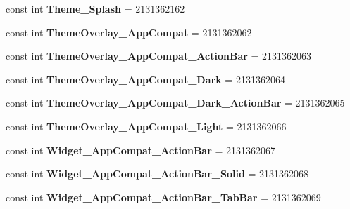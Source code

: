 \begin{DoxyCompactItemize}
\item 
\mbox{\label{classXaria_1_1Resource_1_1Style_a0c5d14f138b3190d6e885be6d8fe0908}} 
const int {\bfseries Theme\+\_\+\+Splash} = 2131362162
\item 
\mbox{\label{classXaria_1_1Resource_1_1Style_afd3ef424b8e9c412bd491f3a3e71a324}} 
const int {\bfseries Theme\+Overlay\+\_\+\+App\+Compat} = 2131362062
\item 
\mbox{\label{classXaria_1_1Resource_1_1Style_a119730b7e96cceb04f849bff5649951b}} 
const int {\bfseries Theme\+Overlay\+\_\+\+App\+Compat\+\_\+\+Action\+Bar} = 2131362063
\item 
\mbox{\label{classXaria_1_1Resource_1_1Style_a16531aaab4949bc5f3fbcccd881b2f28}} 
const int {\bfseries Theme\+Overlay\+\_\+\+App\+Compat\+\_\+\+Dark} = 2131362064
\item 
\mbox{\label{classXaria_1_1Resource_1_1Style_a5206607226c8d61fc59d971f60a36317}} 
const int {\bfseries Theme\+Overlay\+\_\+\+App\+Compat\+\_\+\+Dark\+\_\+\+Action\+Bar} = 2131362065
\item 
\mbox{\label{classXaria_1_1Resource_1_1Style_abb21776a3c390fe3c4c257f355b6acf7}} 
const int {\bfseries Theme\+Overlay\+\_\+\+App\+Compat\+\_\+\+Light} = 2131362066
\item 
\mbox{\label{classXaria_1_1Resource_1_1Style_a0ea85fd0de83ff5665de48efc96f4caf}} 
const int {\bfseries Widget\+\_\+\+App\+Compat\+\_\+\+Action\+Bar} = 2131362067
\item 
\mbox{\label{classXaria_1_1Resource_1_1Style_ac4d205e1776105194f4e9b765ca1a672}} 
const int {\bfseries Widget\+\_\+\+App\+Compat\+\_\+\+Action\+Bar\+\_\+\+Solid} = 2131362068
\item 
\mbox{\label{classXaria_1_1Resource_1_1Style_a75a9abc23c0e4ad06c0ba44ffbe1bc3c}} 
const int {\bfseries Widget\+\_\+\+App\+Compat\+\_\+\+Action\+Bar\+\_\+\+Tab\+Bar} = 2131362069

\end{DoxyCompactItemize}
